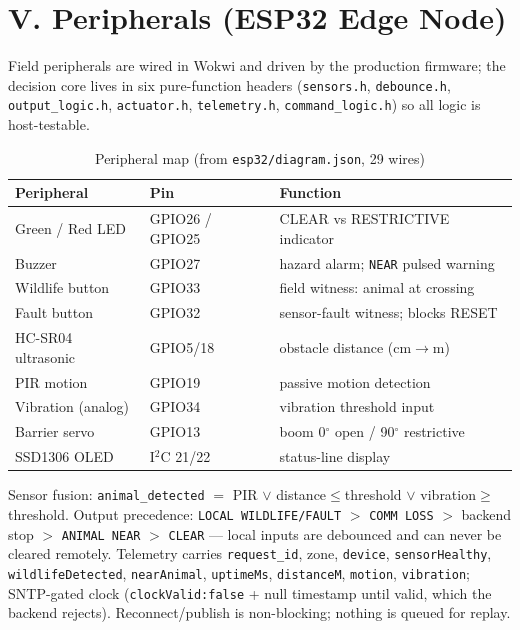 \documentclass[10pt,a4paper,twocolumn]{article}
\newcommand{\sect}[1]{\section{#1}}
\begin{document}
\sect{V. Peripherals (ESP32 Edge Node)}
Field peripherals are wired in Wokwi and driven by the production firmware; the decision core lives in six pure-function headers (\texttt{sensors.h}, \texttt{debounce.h}, \texttt{output\_logic.h}, \texttt{actuator.h}, \texttt{telemetry.h}, \texttt{command\_logic.h}) so all logic is host-testable.
\begin{table}[H]\scriptsize
\caption{Peripheral map (from \texttt{esp32/diagram.json}, 29 wires)}\label{tab:periph}
\begin{tabularx}{\linewidth}{p{2.6cm} p{1.55cm} X}
\toprule
\textbf{Peripheral} & \textbf{Pin} & \textbf{Function}\\
\midrule
Green / Red LED & GPIO26 / GPIO25 & CLEAR vs RESTRICTIVE indicator\\
Buzzer & GPIO27 & hazard alarm; \texttt{NEAR} pulsed warning\\
Wildlife button & GPIO33 & field witness: animal at crossing\\
Fault button & GPIO32 & sensor-fault witness; blocks RESET\\
HC-SR04 ultrasonic & GPIO5/18 & obstacle distance (cm$\rightarrow$m)\\
PIR motion & GPIO19 & passive motion detection\\
Vibration (analog) & GPIO34 & vibration threshold input\\
Barrier servo & GPIO13 & boom 0$^\circ$ open / 90$^\circ$ restrictive\\
SSD1306 OLED & I$^2$C 21/22 & status-line display\\
\bottomrule
\end{tabularx}
\end{table}
Sensor fusion: \texttt{animal\_detected} $=$ PIR $\lor$ distance$\le$threshold $\lor$ vibration$\ge$threshold. Output precedence: \texttt{LOCAL WILDLIFE/FAULT} $>$ \texttt{COMM LOSS} $>$ backend stop $>$ \texttt{ANIMAL NEAR} $>$ \texttt{CLEAR} --- local inputs are debounced and can never be cleared remotely. Telemetry carries \texttt{request\_id}, zone, \texttt{device}, \texttt{sensorHealthy}, \texttt{wildlifeDetected}, \texttt{nearAnimal}, \texttt{uptimeMs}, \texttt{distanceM}, \texttt{motion}, \texttt{vibration}; SNTP-gated clock (\texttt{clockValid:false} + null timestamp until valid, which the backend rejects). Reconnect/publish is non-blocking; nothing is queued for replay.
\end{document}
